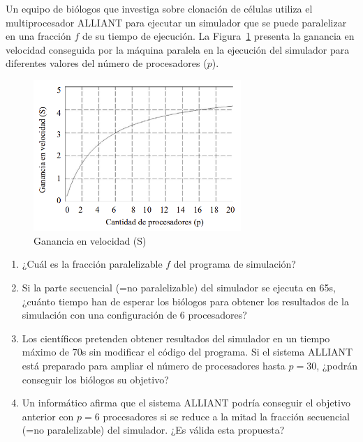 \begin{ejercicio}
Un equipo de biólogos que investiga sobre clonación de células utiliza el multiprocesador ALLIANT para ejecutar un simulador que se puede paralelizar en una fracción $f$ de su tiempo de ejecución. La Figura~\ref{fig:1_10} presenta la ganancia en velocidad conseguida por la máquina paralela en la ejecución del simulador para diferentes valores del número de procesadores ($p$).
\begin{figure}
    \centering
    \includegraphics[width=0.7\textwidth]{Figuras/Ej_1_10.png}
    \caption{Ganancia en velocidad (S)}
    \label{fig:1_10}
\end{figure}
\begin{enumerate}
    \item ¿Cuál es la fracción paralelizable $f$ del programa de simulación?
    \item Si la parte secuencial (=no paralelizable) del simulador se ejecuta en 65s, ¿cuánto tiempo han de esperar los biólogos para obtener los resultados de la simulación con una configuración de 6 procesadores?
    \item Los científicos pretenden obtener resultados del simulador en un tiempo máximo de 70s sin modificar el código del programa. Si el sistema ALLIANT está preparado para ampliar el número de procesadores hasta $p = 30$, ¿podrán conseguir los biólogos su objetivo?
    \item Un informático afirma que el sistema ALLIANT podría conseguir el objetivo anterior con $p = 6$ procesadores si se reduce a la mitad la fracción secuencial (=no paralelizable) del simulador. ¿Es válida esta propuesta?
\end{enumerate}
\end{ejercicio}

